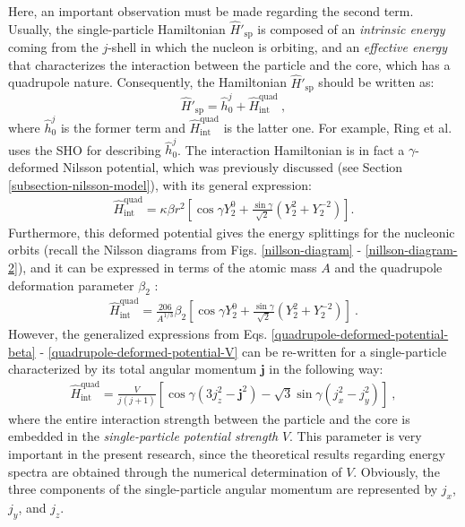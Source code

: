 Here, an important observation must be made regarding the second term. Usually, the single-particle Hamiltonian $\hat{H}'_\text{sp}$ is composed of an \emph{intrinsic energy} coming from the $j$-shell in which the nucleon is orbiting, and an \emph{effective energy} that characterizes the interaction between the particle and the core, which has a quadrupole nature. Consequently, the Hamiltonian $\hat{H}'_\text{sp}$ should be written as: $$\hat{H}'_\text{sp}=\hat{h}_0^j+\hat{H}_\text{int}^\text{quad}\ ,$$where $\hat{h}_0^j$ is the former term and $\hat{H}_\text{int}^\text{quad}$ is the latter one.
For example, Ring et al. \cite{ring2004nuclear} uses the SHO for describing $\hat{h}_0^j$. The interaction Hamiltonian is in fact a $\gamma$-deformed Nilsson potential, which was previously discussed (see Section \ref{subsection-nilsson-model}), with its general expression:
\begin{align}
    \hat{H}_\text{int}^\text{quad}=\kappa\beta r^2\left[\cos\gamma Y_{2}^{0}+\frac{\sin\gamma}{\sqrt{2}}\left(Y_2^2+Y_2^{-2}\right)\right].
    \label{quadrupole-deformed-potential-beta}
\end{align}
Furthermore, this deformed potential gives the energy splittings for the nucleonic orbits (recall the Nilsson diagrams from Figs. \ref{nillson-diagram} - \ref{nillson-diagram-2}), and it can be expressed in terms of the atomic mass $A$ and the quadrupole deformation parameter $\beta_2$ \cite{peng2003description}:
\begin{align}
    \hat{H}_\text{int}^\text{quad}=\frac{206}{A^{1/3}}\beta_2\left[\cos\gamma Y_2^0+\frac{\sin\gamma}{\sqrt{2}}(Y_2^2+Y_2^{-2})\right]\ .
    \label{quadrupole-deformed-potential-V}
\end{align}
However, the generalized expressions from Eqs. \eqref{quadrupole-deformed-potential-beta} - \eqref{quadrupole-deformed-potential-V} can be re-written for a single-particle characterized by its total angular momentum $\mathbf{j}$ in the following way:
\begin{align}
    \hat{H}_\text{int}^\text{quad}=\frac{V}{j(j+1)}\left[\cos\gamma(3j_z^2-\mathbf{j}^2)-\sqrt{3}\sin\gamma(j_x^2-j_y^2)\right]\ ,
    \label{single-particle-nilsson-defored-potential}
\end{align}
where the entire interaction strength between the particle and the core is embedded in the \emph{single-particle potential strength} $V$. This parameter is very important in the present research, since the theoretical results regarding energy spectra are obtained through the numerical determination of $V$. Obviously, the three components of the single-particle angular momentum are represented by $j_x$, $j_y$, and $j_z$.

